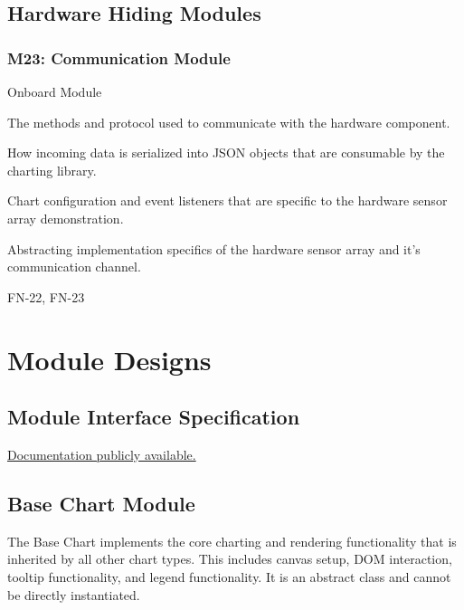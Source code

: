 \documentclass[12pt, titlepage]{article}
\begin{document}
\newpage
\subsection{Hardware Hiding Modules}
\subsubsection{M23: Communication Module}
\begin{description}[style=nextline]
\item[Type:] Onboard Module
\item[Secrets:] The methods and protocol used to communicate with the hardware component.
    \item How incoming data is serialized into JSON objects that are consumable by the charting library.
    \item Chart configuration and event listeners that are specific to the hardware sensor array demonstration.
\item[Responsibilities:] Abstracting implementation specifics of the hardware sensor array and it's communication channel.
\item[Requirements:] FN-22, FN-23
\end{description}

\newpage
\section{Module Designs}
\subsection{Module Interface Specification}

\href{https://carbon-design-system.github.io/carbon-charts/documentation/}{Documentation publicly available.}
\subsection{Base Chart Module}
The Base Chart implements the core charting and rendering functionality that is inherited by all other chart types. This includes canvas setup, DOM interaction, tooltip functionality, and legend functionality. It is an abstract class and cannot be directly instantiated.
\end{document}
